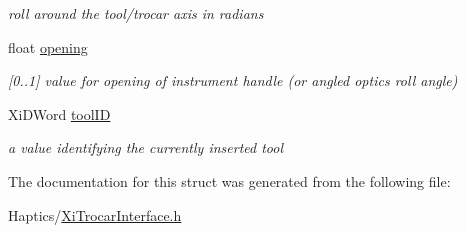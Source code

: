 \begin{DoxyCompactItemize}
\begin{DoxyCompactList}\small\item\em roll around the tool/trocar axis in radians \item\end{DoxyCompactList}\item 
\hypertarget{structXiToolState___a88d7a8e92d2ac484aa3af11d9afb3016}{
float \hyperlink{structXiToolState___a88d7a8e92d2ac484aa3af11d9afb3016}{opening}}
\label{structXiToolState___a88d7a8e92d2ac484aa3af11d9afb3016}

\begin{DoxyCompactList}\small\item\em \mbox{[}0..1\mbox{]} value for opening of instrument handle (or angled optics roll angle) \item\end{DoxyCompactList}\item 
\hypertarget{structXiToolState___a3ff59e30a53cf38de448fb6abb0ec952}{
XiDWord \hyperlink{structXiToolState___a3ff59e30a53cf38de448fb6abb0ec952}{toolID}}
\label{structXiToolState___a3ff59e30a53cf38de448fb6abb0ec952}

\begin{DoxyCompactList}\small\item\em a value identifying the currently inserted tool \item\end{DoxyCompactList}\end{DoxyCompactItemize}


The documentation for this struct was generated from the following file:\begin{DoxyCompactItemize}
\item 
Haptics/\hyperlink{XiTrocarInterface_8h}{XiTrocarInterface.h}\end{DoxyCompactItemize}
